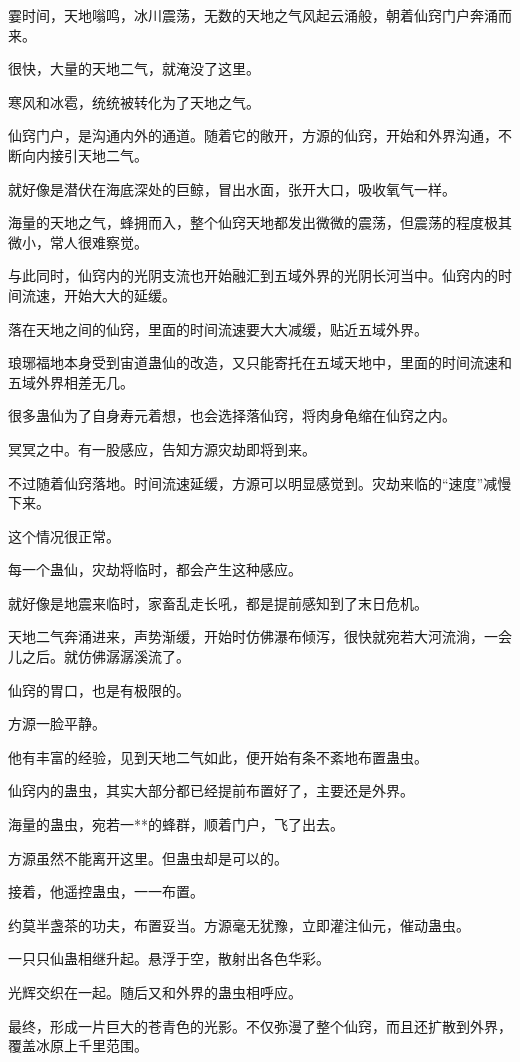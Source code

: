 \begin{this_body}
霎时间，天地嗡鸣，冰川震荡，无数的天地之气风起云涌般，朝着仙窍门户奔涌而来。

很快，大量的天地二气，就淹没了这里。

寒风和冰雹，统统被转化为了天地之气。

仙窍门户，是沟通内外的通道。随着它的敞开，方源的仙窍，开始和外界沟通，不断向内接引天地二气。

就好像是潜伏在海底深处的巨鲸，冒出水面，张开大口，吸收氧气一样。

海量的天地之气，蜂拥而入，整个仙窍天地都发出微微的震荡，但震荡的程度极其微小，常人很难察觉。

与此同时，仙窍内的光阴支流也开始融汇到五域外界的光阴长河当中。仙窍内的时间流速，开始大大的延缓。

落在天地之间的仙窍，里面的时间流速要大大减缓，贴近五域外界。

琅琊福地本身受到宙道蛊仙的改造，又只能寄托在五域天地中，里面的时间流速和五域外界相差无几。

很多蛊仙为了自身寿元着想，也会选择落仙窍，将肉身龟缩在仙窍之内。

冥冥之中。有一股感应，告知方源灾劫即将到来。

不过随着仙窍落地。时间流速延缓，方源可以明显感觉到。灾劫来临的“速度”减慢下来。

这个情况很正常。

每一个蛊仙，灾劫将临时，都会产生这种感应。

就好像是地震来临时，家畜乱走长吼，都是提前感知到了末日危机。

天地二气奔涌进来，声势渐缓，开始时仿佛瀑布倾泻，很快就宛若大河流淌，一会儿之后。就仿佛潺潺溪流了。

仙窍的胃口，也是有极限的。

方源一脸平静。

他有丰富的经验，见到天地二气如此，便开始有条不紊地布置蛊虫。

仙窍内的蛊虫，其实大部分都已经提前布置好了，主要还是外界。

海量的蛊虫，宛若一**的蜂群，顺着门户，飞了出去。

方源虽然不能离开这里。但蛊虫却是可以的。

接着，他遥控蛊虫，一一布置。

约莫半盏茶的功夫，布置妥当。方源毫无犹豫，立即灌注仙元，催动蛊虫。

一只只仙蛊相继升起。悬浮于空，散射出各色华彩。

光辉交织在一起。随后又和外界的蛊虫相呼应。

最终，形成一片巨大的苍青色的光影。不仅弥漫了整个仙窍，而且还扩散到外界，覆盖冰原上千里范围。


\end{this_body}
